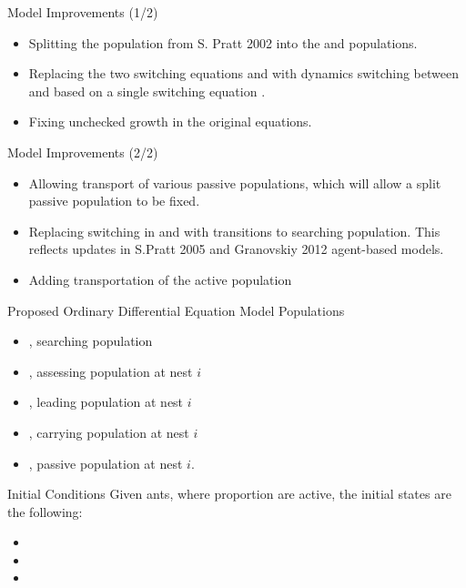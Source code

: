 \documentclass{beamer}
\makeatletter
\def\mcolor#1#{\@mcolor{#1}}
\def\@mcolor#1#2#3{%
  \protect\leavevmode
  \begingroup
    \color#1{#2}#3%
  \endgroup
}
\makeatother
\begin{document}
\begin{frame}{Model Improvements (1/2)}
  \begin{itemize}
      \item Splitting the  population from S. Pratt 2002 into the  and  populations.
      \item Replacing the two switching equations  and  with dynamics switching between  and  based on a single switching equation .
      \item Fixing unchecked growth in the original  equations.
  \end{itemize}
\end{frame}

\begin{frame}{Model Improvements (2/2)}
  \begin{itemize}
      \item Allowing transport of various passive populations, which will allow a split passive population to be fixed.
      \item Replacing switching in  and  with transitions to searching population. This reflects updates in S.Pratt 2005 and Granovskiy 2012 agent-based models.
      \item Adding transportation of the active population
  \end{itemize}
\end{frame}

\begin{frame}{Proposed Ordinary Differential Equation Model Populations}
  \begin{itemize}
      \item {}, searching population
      \item {}, assessing population at nest $i$
      \item {}, leading population at nest $i$
      \item {}, carrying population at nest $i$
      \item {}, passive population at nest $i$. 
  \end{itemize}
\end{frame}

 
\begin{frame}{Initial Conditions}
    Given  ants, where proportion  are active, the initial states are the following:
   \begin{itemize}
       \item {}
       \item {}
       \item {}
   \end{itemize}
\end{frame}
 
\end{document}
